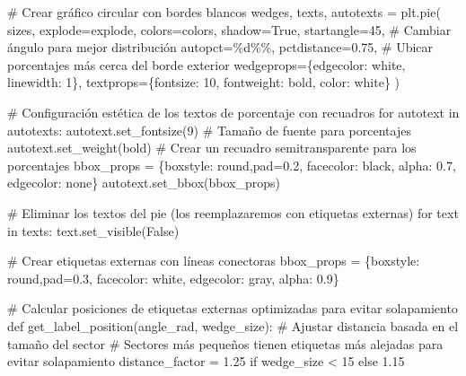 \documentclass[
]{article}
\newenvironment{Shaded}{\begin{snugshade}}{\end{snugshade}}
\newcommand{\StringTok}[1]{\textcolor[rgb]{0.31,0.60,0.02}{#1}}
\begin{document}
\begin{Shaded}
\begin{Highlighting}[]
\StringTok{\# Crear gráfico circular con bordes blancos}
\StringTok{wedges, texts, autotexts = plt.pie(}
\StringTok{    sizes,}
\StringTok{    explode=explode,}
\StringTok{    colors=colors,}
\StringTok{    shadow=True,}
\StringTok{    startangle=45,  \# Cambiar ángulo para mejor distribución}
\StringTok{    autopct=\textquotesingle{}\%d\%\%\textquotesingle{},}
\StringTok{    pctdistance=0.75,  \# Ubicar porcentajes más cerca del borde exterior}
\StringTok{    wedgeprops=\{\textquotesingle{}edgecolor\textquotesingle{}: \textquotesingle{}white\textquotesingle{}, \textquotesingle{}linewidth\textquotesingle{}: 1\},}
\StringTok{    textprops=\{\textquotesingle{}fontsize\textquotesingle{}: 10, \textquotesingle{}fontweight\textquotesingle{}: \textquotesingle{}bold\textquotesingle{}, \textquotesingle{}color\textquotesingle{}: \textquotesingle{}white\textquotesingle{}\}}
\StringTok{)}

\StringTok{\# Configuración estética de los textos de porcentaje con recuadros}
\StringTok{for autotext in autotexts:}
\StringTok{    autotext.set\_fontsize(9)  \# Tamaño de fuente para porcentajes}
\StringTok{    autotext.set\_weight(\textquotesingle{}bold\textquotesingle{})}
\StringTok{    \# Crear un recuadro semitransparente para los porcentajes}
\StringTok{    bbox\_props = \{\textquotesingle{}boxstyle\textquotesingle{}: \textquotesingle{}round,pad=0.2\textquotesingle{},}
\StringTok{                 \textquotesingle{}facecolor\textquotesingle{}: \textquotesingle{}black\textquotesingle{},}
\StringTok{                 \textquotesingle{}alpha\textquotesingle{}: 0.7,}
\StringTok{                 \textquotesingle{}edgecolor\textquotesingle{}: \textquotesingle{}none\textquotesingle{}\}}
\StringTok{    autotext.set\_bbox(bbox\_props)}

\StringTok{\# Eliminar los textos del pie (los reemplazaremos con etiquetas externas)}
\StringTok{for text in texts:}
\StringTok{    text.set\_visible(False)}

\StringTok{\# Crear etiquetas externas con líneas conectoras}
\StringTok{bbox\_props = \{\textquotesingle{}boxstyle\textquotesingle{}: \textquotesingle{}round,pad=0.3\textquotesingle{},}
\StringTok{             \textquotesingle{}facecolor\textquotesingle{}: \textquotesingle{}white\textquotesingle{},}
\StringTok{             \textquotesingle{}edgecolor\textquotesingle{}: \textquotesingle{}gray\textquotesingle{},}
\StringTok{             \textquotesingle{}alpha\textquotesingle{}: 0.9\}}

\StringTok{\# Calcular posiciones de etiquetas externas optimizadas para evitar solapamiento}
\StringTok{def get\_label\_position(angle\_rad, wedge\_size):}
\StringTok{    \# Ajustar distancia basada en el tamaño del sector}
\StringTok{    \# Sectores más pequeños tienen etiquetas más alejadas para evitar solapamiento}
\StringTok{    distance\_factor = 1.25 if wedge\_size \textless{} 15 else 1.15}


\end{Highlighting}
\end{Shaded}
\end{document}
